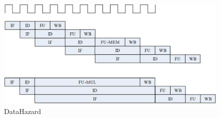 \begin{figure}[H] %
	\centering %
	\includegraphics[width=1.0\textwidth]{figs/DataHazard.png} %
	\caption{DataHazard} %
	\label{Fig.2} %
\end{figure}

